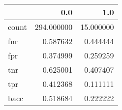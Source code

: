 \begin{tabular}{lrr}
\toprule
{} &         0.0 &        1.0 \\
\midrule
count &  294.000000 &  15.000000 \\
fnr   &    0.587632 &   0.444444 \\
fpr   &    0.374999 &   0.259259 \\
tnr   &    0.625001 &   0.407407 \\
tpr   &    0.412368 &   0.111111 \\
bacc  &    0.518684 &   0.222222 \\
\bottomrule
\end{tabular}

